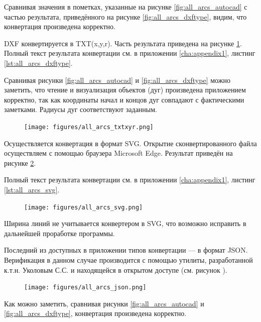 Сравнивая значения в пометках, указанные на рисунке \ref{fig:all_arcs_autocad} с частью результата, приведённого на рисунке \ref{fig:all_arcs_dxftype}, видим, что конвертация произведена корректно.

DXF конвертируется в TXT(x,y,r). Часть результата приведена на рисунке \ref{fig:all_arcs_txtxyr}. Полный текст результата конвертации см. в приложении \ref{cha:appendix1}, листинг \ref{lst:all_arcs_dxftype}.

Сравнивая рисунки \ref{fig:all_arcs_autocad} и \ref{fig:all_arcs_dxftype} можно заметить, что чтение и визуализация объектов (дуг) произведена приложением корректно, так как координаты начал и концов дуг совпадают с фактическими заметками. Радиусы дуг соответствуют заданным.

\begin{figure}[H]
	\centering
	\texttt{[image: figures/all\_arcs\_txtxyr.png]}
	\label{fig:all_arcs_txtxyr}
\end{figure}

Осуществляется конвертация в формат SVG. Открытие сконвертированного файла осуществляем с помощью браузера Microsoft Edge. Результат приведён на рисунке \ref{fig:all_arcs_svg}.

Полный текст результата конвертации см. в приложении \ref{cha:appendix1}, листинг \ref{lst:all_arcs_svg}.

\begin{figure}[H]
	\centering
	\texttt{[image: figures/all\_arcs\_svg.png]}
	\label{fig:all_arcs_svg}
\end{figure}

Ширина линий не учитывается конвертером в SVG, что возможно исправить в дальнейшей проработке программы.

Последний из доступных в приложении типов конвертации --- в формат JSON. Верификация в данном случае производится с помощью утилиты, разработанной к.т.н. Уколовым С.С. \cite{ukoloff} и находящейся в открытом доступе (см. рисунок ).

\begin{figure}[H]
	\centering
	\texttt{[image: figures/all\_arcs\_json.png]}
	\label{fig:all_arcs_json}
\end{figure}

Как можно заметить, сравнивая рисунки \ref{fig:all_arcs_autocad} и \ref{fig:all_arcs_dxftype}, конвертация произведена корректно.

